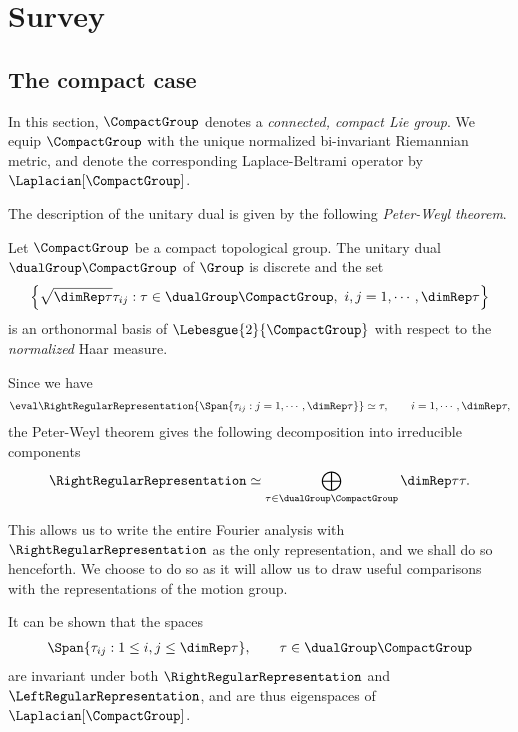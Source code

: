 \chapter{Survey}
\section{The compact case}

In this section,
$\CompactGroup$ denotes a \emph{connected, compact Lie group}.
We equip $\CompactGroup$ with the unique normalized bi-invariant Riemannian metric,
and denote the corresponding Laplace-Beltrami operator by $\Laplacian [\CompactGroup]$.

The description of the unitary dual is given by the following \emph{Peter-Weyl theorem}.

\begin{theorem}
\label{theorem:Peter-Weyl_theorem}
    Let $\CompactGroup$ be a compact topological group.
    The unitary dual $\dualGroup \CompactGroup$ of $\Group$ is discrete and
    the set
    \begin{align*}
        \left\{
            \sqrt{\dimRep\tau} \tau_{ij} : \tau \in \dualGroup\CompactGroup,\ i, j = 1, \cdots, \dimRep\tau
        \right\}
    \end{align*}
    is an orthonormal basis of $\Lebesgue{2}{\CompactGroup}$ with respect to the \emph{normalized} Haar measure.
\end{theorem}

Since we have
\begin{align*}
    \eval \RightRegularRepresentation {\Span \{\tau_{i j} : j = 1, \cdots, \dimRep \tau\}} \simeq \tau,
    \qquad i = 1, \cdots, \dimRep \tau,
\end{align*}
the Peter-Weyl theorem gives the following decomposition into irreducible components
\begin{align*}
    \RightRegularRepresentation \simeq \bigoplus_{\tau \in \dualGroup \CompactGroup} \dimRep \tau \tau.
\end{align*}

This allows us to write the entire Fourier analysis with $\RightRegularRepresentation$ as the only representation,
and we shall do so henceforth.
We choose to do so as it will allow us to draw useful comparisons with the representations of the motion group.

It can be shown that the spaces
\begin{align*}
    \Span \{ \tau_{i j} : 1 \leq i, j \leq \dimRep \tau\}, \qquad \tau \in \dualGroup \CompactGroup
\end{align*}
are invariant under both $\RightRegularRepresentation$ and $\LeftRegularRepresentation$,
and are thus eigenspaces of $\Laplacian [\CompactGroup]$.

